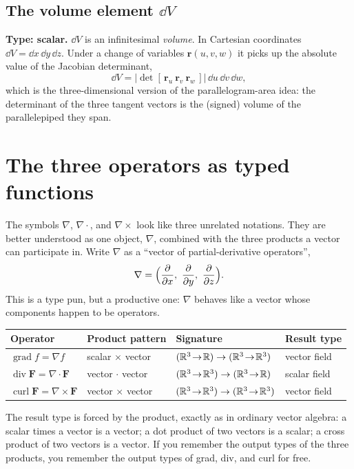 \documentclass{essay}
\newcommand{\F}{\mathbf{F}}
\newcommand{\rr}{\mathbf{r}}
\newcommand{\grad}{\operatorname{grad}}
\newcommand{\dive}{\operatorname{div}}
\newcommand{\curl}{\operatorname{curl}}
\begin{document}
\subsection{The volume element $\dd V$}

\textbf{Type: scalar.} $\dd V$ is an infinitesimal \emph{volume}. In Cartesian
coordinates $\dd V = \dd x\,\dd y\,\dd z$. Under a change of variables
$\rr(u,v,w)$ it picks up the absolute value of the Jacobian determinant,
\[
\dd V = \bigl\lvert \det[\,\rr_u\ \rr_v\ \rr_w\,] \bigr\rvert \,\dd u\,\dd v\,\dd w,
\]
which is the three-dimensional version of the parallelogram-area idea: the
determinant of the three tangent vectors is the (signed) volume of the
parallelepiped they span.

\section{The three operators as typed functions}

The symbols $\nabla$, $\nabla\cdot$, and $\nabla\times$ look like three unrelated
notations. They are better understood as one object, $\nabla$, combined with the
three products a vector can participate in. Write $\nabla$ as a ``vector of
partial-derivative operators'',
\[
\nabla = \Bigl(\frac{\partial}{\partial x},\ \frac{\partial}{\partial y},\
\frac{\partial}{\partial z}\Bigr).
\]
This is a type pun, but a productive one: $\nabla$ behaves like a vector whose
components happen to be operators.

\begin{center}
\renewcommand{\arraystretch}{1.5}
\begin{tabular}{@{}l l l l@{}}
\toprule
\textbf{Operator} & \textbf{Product pattern} & \textbf{Signature} & \textbf{Result type} \\
\midrule
$\grad f = \nabla f$           & scalar $\times$ vector & $(\mathbb{R}^3\!\to\!\mathbb{R})\to(\mathbb{R}^3\!\to\!\mathbb{R}^3)$ & vector field \\
$\dive \F = \nabla\cdot\F$     & vector $\cdot$ vector  & $(\mathbb{R}^3\!\to\!\mathbb{R}^3)\to(\mathbb{R}^3\!\to\!\mathbb{R})$ & scalar field \\
$\curl \F = \nabla\times\F$    & vector $\times$ vector & $(\mathbb{R}^3\!\to\!\mathbb{R}^3)\to(\mathbb{R}^3\!\to\!\mathbb{R}^3)$ & vector field \\
\bottomrule
\end{tabular}
\end{center}

The result type is forced by the product, exactly as in ordinary vector algebra:
a scalar times a vector is a vector; a dot product of two vectors is a scalar; a
cross product of two vectors is a vector. If you remember the output types of the
three products, you remember the output types of grad, div, and curl for free.
\end{document}
